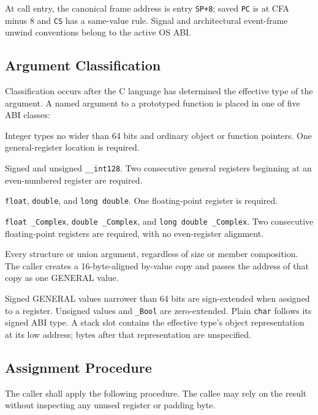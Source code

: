 \documentclass[10pt,twoside]{article}
\begin{document}
At call entry, the canonical frame address is entry \texttt{SP+8}; saved
\texttt{PC} is at CFA minus 8 and \texttt{CS} has a same-value rule. Signal
and architectural event-frame unwind conventions belong to the active OS ABI.

\Needspace{2.4in}
\subsection{Argument Classification}
Classification occurs after the C language has determined the effective type
of the argument. A named argument to a prototyped function is placed in one of
five ABI classes:

\begin{description}[style=nextline,leftmargin=1.35in,labelwidth=1.25in,itemsep=3pt,topsep=3pt]
\item[GENERAL] Integer types no wider than 64 bits and ordinary object or
function pointers. One general-register location is required.
\item[GENERAL-PAIR] Signed and unsigned \texttt{\_\_int128}. Two consecutive
general registers beginning at an even-numbered register are required.
\item[FLOAT] \texttt{float}, \texttt{double}, and \texttt{long double}. One
floating-point register is required.
\item[FLOAT-PAIR] \texttt{float \_Complex}, \texttt{double \_Complex}, and
\texttt{long double \_Complex}. Two consecutive floating-point registers are
required, with no even-register alignment.
\item[INDIRECT] Every structure or union argument, regardless of size or
member composition. The caller creates a 16-byte-aligned by-value copy and
passes the address of that copy as one GENERAL value.
\end{description}

Signed GENERAL values narrower than 64 bits are sign-extended when assigned to
a register. Unsigned values and \texttt{\_Bool} are zero-extended. Plain
\texttt{char} follows its signed ABI type. A stack slot contains the effective
type's object representation at its low address; bytes after that
representation are unspecified.

\subsection{Assignment Procedure}
The caller shall apply the following procedure. The callee may rely on the
result without inspecting any unused register or padding byte.
\end{document}
